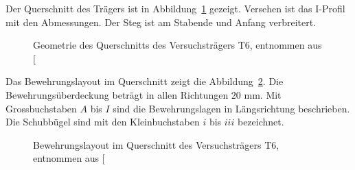 \documentclass[
  11pt,
  letterpaper,
]{scrreprt}
\begin{document}
Der Querschnitt des Trägers ist in Abbildung~\ref{fig-geometrie_qs_t6}
gezeigt. Versehen ist das I-Profil mit den Abmessungen. Der Steg ist am
Stabende und Anfang verbreitert.

\begin{figure}[H]


\caption{\label{fig-geometrie_qs_t6}Geometrie des Querschnitts des
Versuchsträgers T6, entnommen aus
{[}\citeproc{ref-sigrist_versuche_1993}{5}{]}}

\end{figure}%

Das Bewehrungslayout im Querschnitt zeigt die
Abbildung~\ref{fig-bewehrung_qs_t6}. Die Bewehrungsüberdeckung beträgt
in allen Richtungen \(20\) mm. Mit Grossbuchstaben \(A\) bis \(I\) sind
die Bewehrungslagen in Längsrichtung beschrieben. Die Schubbügel sind
mit den Kleinbuchstaben \(i\) bis \(iii\) bezeichnet.

\begin{figure}[H]


\caption{\label{fig-bewehrung_qs_t6}Bewehrungslayout im Querschnitt des
Versuchsträgers T6, entnommen aus
{[}\citeproc{ref-sigrist_versuche_1993}{5}{]}}

\end{figure}%
\end{document}
